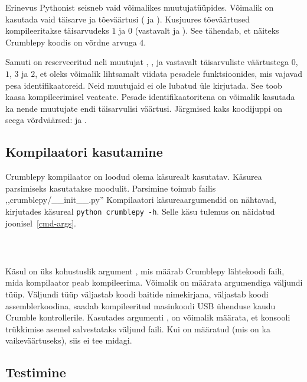 \documentclass[12pt]{article}
\begin{document}
Erinevus Pythonist seisneb vaid võimalikes muutujatüüpides. Võimalik on kasutada vaid täisarve ja tõeväärtusi ( ja ). Kusjuures tõeväärtused kompileeritakse täisarvudeks $1$ ja $0$ (vastavalt  ja ). See tähendab, et näiteks  Crumblepy koodis on võrdne arvuga $4$.

Samuti on reserveeritud neli muutujat , ,  ja  vastavalt täisarvuliste väärtustega $0$, $1$, $3$ ja $2$, et oleks võimalik lihtsamalt viidata pesadele funktsioonides, mis vajavad pesa identifikaatoreid. Neid muutujaid ei ole lubatud üle kirjutada. See toob kaasa kompileerimisel veateate. Pesade identifikaatoritena on võimalik kasutada ka nende muutujate endi täisarvulisi väärtusi. Järgmised kaks koodijuppi on seega võrdväärsed:  ja .

\subsection{Kompilaatori kasutamine}
Crumblepy kompilaator on loodud olema käsurealt kasutatav. Käsurea parsimiseks kasutatakse  moodulit. Parsimine toimub failis \hbox{,,crumblepy/\_\_init\_\_.py''} Kompilaatori käsureaargumendid on nähtavad, kirjutades käsureal \texttt{python crumblepy -h}. Selle käsu tulemus on näidatud joonisel~\ref{cmd-args}.


\inputminted{text}{cmd-args.txt}
\label{cmd-args}
~

Käsul on üks kohustuslik argument , mis määrab Crumblepy lähtekoodi faili, mida kompilaator peab kompileerima. Võimalik on määrata argumendiga  väljundi tüüp. Väljundi tüüp  väljastab koodi baitide nimekirjana,  väljastab koodi assemblerkoodina,  saadab kompileeritud masinkoodi USB ühenduse kaudu Crumble kontrollerile. Kasutades argumenti , on võimalik määrata, et konsooli trükkimise asemel salvestataks väljund faili. Kui on määratud  (mis on ka vaikeväärtuseks), siis  ei tee midagi.

\subsection{Testimine}
\end{document}
